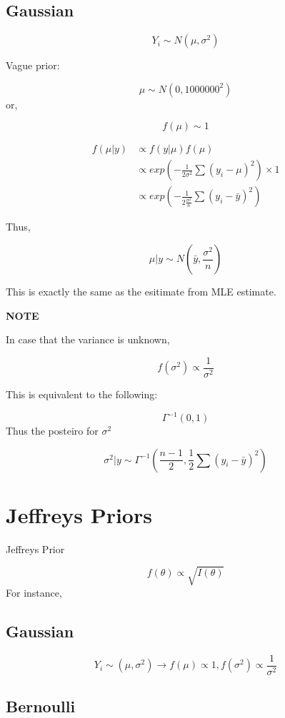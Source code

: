 \documentclass[
]{book}
\begin{document}
\hypertarget{gaussian}{%
\subsection{Gaussian}\label{gaussian}}

\[Y_i \sim N(\mu, \sigma^2)\]

Vague prior:

\[\mu \sim N(0, 1000000^2)\]
or,

\[f(\mu) \sim 1\]

\[\begin{aligned} f(\mu | y) &\propto f(y|\mu)f(\mu) \\ &\propto exp(-\frac{1}{2 \sigma^2} \sum (y_i-\mu)^2) \times 1 \\ &\propto exp(-\frac{1}{2 \frac{\sigma^2}{n}} \sum (y_i-\bar{y})^2) \end{aligned}\]

Thus,

\[\mu | y \sim N(\bar{y}, \frac{\sigma^2}{n})\]

This is exactly the same as the esitimate from MLE estimate.

\textbf{NOTE}

In case that the variance is unknown,

\[f(\sigma^2) \propto \frac{1}{\sigma^2}\]

This is equivalent to the following:

\[\Gamma ^{-1}(0,1)\]
Thus the posteiro for \(\sigma^2\)

\[\sigma^2|y \sim \Gamma ^{-1} (\frac{n-1}{2},\frac{1}{2} \sum (y_i-\bar{y})^2)\]

\hypertarget{jeffreys-priors}{%
\section{Jeffreys Priors}\label{jeffreys-priors}}

Jeffreys Prior

\[f(\theta) \propto \sqrt{I(\theta)}\]
For instance,

\hypertarget{gaussian-1}{%
\subsection{Gaussian}\label{gaussian-1}}

\[Y_i \sim (\mu, \sigma^2) \rightarrow f(\mu) \propto 1, f(\sigma^2)\propto \frac{1}{\sigma^2}\]

\hypertarget{bernoulli-1}{%
\subsection{Bernoulli}\label{bernoulli-1}}
\end{document}
